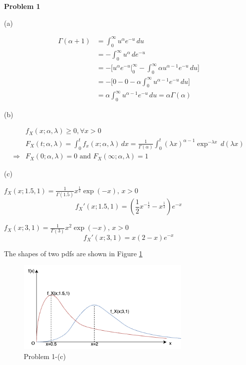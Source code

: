 \documentclass[letterpaper, 11pt]{article}
\newcommand{\1}{\mathds{1}}	%
\theoremstyle{definition}
\begin{document}
\textbf{Problem 1}

(a)

\begin{align*}
    \Gamma(\alpha+1) & = \int_{0}^{\infty } u^{\alpha} e^{-u} \, du                                                            \\
                     & = - \int_{0}^{\infty} u^{\alpha} \, de^{-u}                                                             \\
                     & = - \Big[u^{\alpha}e^{-u}\Big|_0^{\infty }- \int_{0}^{\infty } \alpha u^{\alpha - 1} e^{-u}  \, du\Big] \\
                     & = -\Big[ 0- 0- \alpha \int_{0}^{\infty } u^{\alpha-1}e^{-u} \, du \Big]                                 \\
                     & =  \alpha \int_{0}^{\infty } u^{\alpha-1}e^{-u} \, du = \alpha \Gamma(\alpha)
\end{align*}


(b)

\begin{align*}
                    & f_X(x;\alpha,\lambda) \geq  0, \forall x > 0                                                                                                                          \\
                    & F_X(t;\alpha,\lambda) = \int_{0}^{t} f_x(x;\alpha,\lambda) \, dx = \frac{1}{\Gamma(\alpha)} \int_{0}^{t} (\lambda x)^{\alpha - 1} \exp ^{-\lambda x}  \, d(\lambda x) \\
    \Longrightarrow & F_X(0;\alpha,\lambda) = 0 \text{ and }  F_X(\infty ;\alpha,\lambda) = 1
\end{align*}

(c)

$f_X(x;1.5,1) = \frac{1}{\Gamma(1.5)}x^\frac{1}{2}\exp(-x), \, x>0$ \[
    f_X'(x;1.5,1) = (\frac{1}{2}x^{-\frac{1}{2}}-x^{\frac{1}{2}})e^{-x}
\]

$f_X(x;3,1) = \frac{1}{\Gamma(3)}x^2\exp(-x), \, x>0$ \[
    f_X'(x;3,1) = x(2-x)e^{-x}
\]

The shapes of two pdfs are shown in Figure \ref{fig:p1-c}

\begin{figure}[H] %
    \centering
    \includegraphics[width=0.75\textwidth]{images/stats-a1-p1-c.drawio.png}
    \caption{Problem 1-(c)}
    \label{fig:p1-c}
\end{figure}
\end{document}

